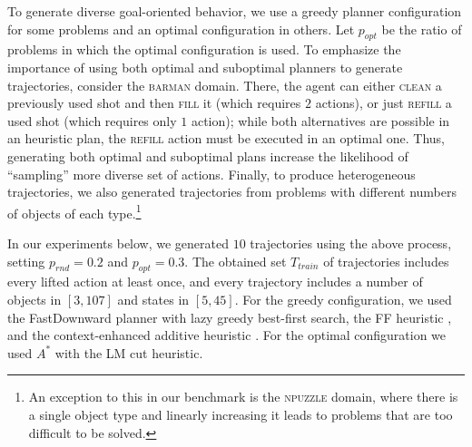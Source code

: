 \documentclass{article}
\theoremstyle{definition}
\theoremstyle{remark}
\newcommand{\T}{T}
\newcommand{\Ttrain}{\T_{train}}
\newif\ifaddcomments
\newcommand{\roni}[1]{\ifaddcomments{\textcolor{red}{[Roni: #1]}}\fi}
\newcommand{\leo}[1]{\ifaddcomments{\textcolor{pink}{[Leonardo: #1]}}\fi}
\begin{document}
To generate diverse goal-oriented behavior, we use a greedy planner configuration for some problems and an optimal configuration in others. 
Let $p_{opt}$ be the ratio of problems in which the optimal configuration is used. 
To emphasize the importance of using both optimal and suboptimal planners to generate trajectories, consider the \textsc{barman} domain. 
There, the agent can either \textsc{clean} a previously used shot and then \textsc{fill} it (which requires $2$ actions), or just \textsc{refill} a used shot (which requires only $1$ action); while both alternatives are possible in an heuristic plan, the \textsc{refill} action must be executed in an optimal one. 
Thus, generating both optimal and suboptimal plans increase the likelihood of ``sampling'' more diverse set of actions. 
Finally, to produce heterogeneous trajectories, we also generated trajectories from problems with different numbers of objects of each type.\footnote{An exception to this in our benchmark is the \textsc{npuzzle} domain, where there is a single object type and linearly increasing it leads to problems that are too difficult to be solved.} 


%


In our experiments below, we generated $10$ trajectories using the above process, 
setting $p_{rnd}=0.2$ and $p_{opt}=0.3$. 
The obtained set $\Ttrain$ of trajectories includes every lifted action at least once, and every trajectory includes a number of objects in $[3, 107]$ and states in $[5, 45]$. %
For the greedy configuration, we used the FastDownward planner \citep{helmert2006fast} with lazy greedy best-first search, the
FF heuristic \citep{hoffmann2001ff}, and the context-enhanced additive heuristic \citep{helmert2008unifying}. For the optimal configuration we used $A^*$ with the LM cut heuristic. %





\end{document}
